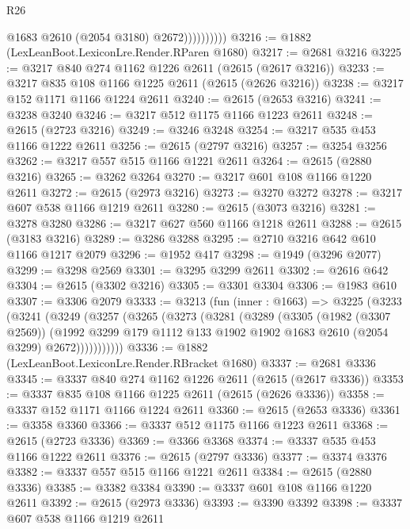 \begin{lexlean}{R26}
\begin{coremodule}
                        @1683
                        @2610
                        (@2054 @3180)
                        @2672))))))))))
@3216 := @1882 (LexLeanBoot.LexiconLre.Render.RParen @1680)
@3217 := @2681 @3216
@3225 := @3217 @840 @274 @1162 @1226 @2611 (@2615 (@2617 @3216))
@3233 := @3217 @835 @108 @1166 @1225 @2611 (@2615 (@2626 @3216))
@3238 := @3217 @152 @1171 @1166 @1224 @2611
@3240 := @2615 (@2653 @3216)
@3241 := @3238 @3240
@3246 := @3217 @512 @1175 @1166 @1223 @2611
@3248 := @2615 (@2723 @3216)
@3249 := @3246 @3248
@3254 := @3217 @535 @453 @1166 @1222 @2611
@3256 := @2615 (@2797 @3216)
@3257 := @3254 @3256
@3262 := @3217 @557 @515 @1166 @1221 @2611
@3264 := @2615 (@2880 @3216)
@3265 := @3262 @3264
@3270 := @3217 @601 @108 @1166 @1220 @2611
@3272 := @2615 (@2973 @3216)
@3273 := @3270 @3272
@3278 := @3217 @607 @538 @1166 @1219 @2611
@3280 := @2615 (@3073 @3216)
@3281 := @3278 @3280
@3286 := @3217 @627 @560 @1166 @1218 @2611
@3288 := @2615 (@3183 @3216)
@3289 := @3286 @3288
@3295 := @2710 @3216 @642 @610 @1166 @1217 @2079
@3296 := @1952 @417
@3298 := @1949 (@3296 @2077)
@3299 := @3298 @2569
@3301 := @3295 @3299 @2611
@3302 := @2616 @642
@3304 := @2615 (@3302 @3216)
@3305 := @3301 @3304
@3306 := @1983 @610
@3307 := @3306 @2079
@3333 := @3213
    (fun (inner : @1663) =>
    @3225
      (@3233
        (@3241
          (@3249
            (@3257
              (@3265
                (@3273
                  (@3281
                    (@3289
                      (@3305
                        (@1982 (@3307 @2569))
                        (@1992
                          @3299
                          @179
                          @1112
                          @133
                          @1902
                          @1902
                          @1683
                          @2610
                          (@2054 @3299)
                          @2672)))))))))))
@3336 := @1882 (LexLeanBoot.LexiconLre.Render.RBracket @1680)
@3337 := @2681 @3336
@3345 := @3337 @840 @274 @1162 @1226 @2611 (@2615 (@2617 @3336))
@3353 := @3337 @835 @108 @1166 @1225 @2611 (@2615 (@2626 @3336))
@3358 := @3337 @152 @1171 @1166 @1224 @2611
@3360 := @2615 (@2653 @3336)
@3361 := @3358 @3360
@3366 := @3337 @512 @1175 @1166 @1223 @2611
@3368 := @2615 (@2723 @3336)
@3369 := @3366 @3368
@3374 := @3337 @535 @453 @1166 @1222 @2611
@3376 := @2615 (@2797 @3336)
@3377 := @3374 @3376
@3382 := @3337 @557 @515 @1166 @1221 @2611
@3384 := @2615 (@2880 @3336)
@3385 := @3382 @3384
@3390 := @3337 @601 @108 @1166 @1220 @2611
@3392 := @2615 (@2973 @3336)
@3393 := @3390 @3392
@3398 := @3337 @607 @538 @1166 @1219 @2611

\end{coremodule}
\end{lexlean}
